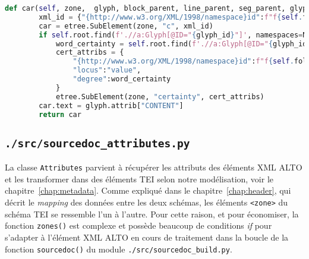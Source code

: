 \documentclass[class=article, crop=false]{standalone}
\begin{document}
\begin{lstlisting}[language=python, style=python]
    def car(self, zone,  glyph, block_parent, line_parent, seg_parent, glyph_id, glyphs_on_page):     
        xml_id = {"{http://www.w3.org/XML/1998/namespace}id":f"f{self.folio}-{block_parent}-{line_parent}-{seg_parent}-{glyph_id}-glyphCount{glyphs_on_page}-text"}
        car = etree.SubElement(zone, "c", xml_id)
        if self.root.find(f'.//a:Glyph[@ID="{glyph_id}"]', namespaces=NS).get("WC") is not None:
            word_certainty = self.root.find(f'.//a:Glyph[@ID="{glyph_id}"]', namespaces=NS).get("WC")
            cert_attribs = {
                "{http://www.w3.org/XML/1998/namespace}id":f"f{self.folio}-{block_parent}-{line_parent}-{seg_parent}-{glyph_id}-glyphCount{glyphs_on_page}-cert",
                "locus":"value",
                "degree":word_certainty
            }
            etree.SubElement(zone, "certainty", cert_attribs)
        car.text = glyph.attrib["CONTENT"]
        return car

\end{lstlisting}

\subsection{\texttt{./src/sourcedoc\_attributes.py}}
La classe \texttt{Attributes} parvient à récupérer les attributs des éléments \acrshort{XML} \acrshort{ALTO} et les transformer dans des éléments \acrshort{TEI} selon notre modélisation, voir le chapitre~\ref{chap:metadata}. Comme expliqué dans le chapitre~\ref{chap:header}, qui décrit le \textit{mapping} des données entre les deux schémas, les éléments \texttt{<zone>} du schéma \acrshort{TEI} se ressemble l'un à l'autre. Pour cette raison, et pour économiser, la fonction \texttt{zones()} est complexe et possède beaucoup de conditions \textit{if} pour s'adapter à l'élément \acrshort{XML} \acrshort{ALTO} en cours de traitement dans la boucle de la fonction \texttt{sourcedoc()} du module \texttt{./src/sourcedoc\_build.py}.
\end{document}
